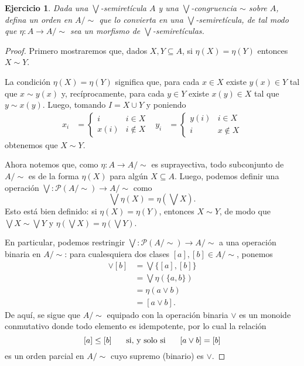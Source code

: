 \documentclass[12pt,letterpaper,titlepage]{article}
\newtheorem{exe}{Ejercicio}
\theoremstyle{definition}
\renewcommand\sup{\vee}
\newcommand\Sup{\bigvee}
\renewcommand\cal[1]{\mathcal{#1}}
\newcommand\simr{{\sim}}
\newcommand\ssi{\hspace{5mm}\text{ si, y solo si }\hspace{5mm}}
\newcommand\<{\langle}
\renewcommand\>{\rangle}
\begin{document}
\begin{exe}%
    Dada una $\Sup$-semiretícula $A$ y una $\Sup$-congruencia
    $\simr$ sobre $A$, defina un orden en $A/\simr$
    que lo convierta en una $\Sup$-semiretícula, de tal modo que
    $\eta:A\to A/\simr$ sea un morfismo de $\Sup$-semiretículas.
\end{exe}
\begin{proof}
    Primero mostraremos que, dados $X,Y\subseteq A$,
    si $\eta(X)=\eta(Y)$ entonces $X\sim Y$.
    
    La condición $\eta(X)=\eta(Y)$ significa que,
    para cada $x\in X$ existe $y(x)\in Y$
    tal que $x\sim y(x)$ y, recíprocamente,
    para cada $y\in Y$ existe $x(y)\in X$ tal que $y\sim x(y)$.
    Luego, tomando $I=X\cup Y$ y poniendo
    \begin{align*}
        x_i &=
            \begin{cases}
                i & i\in X \\
                x(i) & i\nin X
            \end{cases}
        &
        y_i &=
            \begin{cases}
                y(i) & i\in X \\
                i & x\nin X
            \end{cases}
    \end{align*}
    obtenemos que $X\sim Y$.
    
    Ahora notemos que, como $\eta:A\to A/\simr$ es suprayectiva,
    todo subconjunto de $A/\simr$ es de la forma
    $\eta(X)$ para algún $X\subseteq A$.
    Luego, podemos definir una operación
    $\Sup:\cal P(A/\simr)\to A/\simr$ como
    \[
        \Sup \eta(X) = \eta(\Sup X)
    .\]
    Esto está bien definido: si $\eta(X)=\eta(Y)$,
    entonces $X\sim Y$, de modo que $\Sup X\sim\Sup Y$ y
    $\eta(\Sup X)=\eta(\Sup Y)$.
    
    En particular, podemos restringir $\Sup:\cal P(A/\simr)\to A/\simr$
    a una operación binaria en $A/\simr$:
    para cualesquiera dos clases $[a],[b]\in A/\simr$, ponemos
    \begin{align*}
        [a]\sup[b]
        &= \Sup\{[a],[b]\} \\
        &= \Sup\eta(\{a,b\}) \\
        &= \eta(a\sup b) \\
        &= [a\sup b].
    \end{align*}
    De aquí, se sigue que $A/\simr$ equipado con
    la operación binaria $\sup$ es un monoide conmutativo donde
    todo elemento es idempotente,
    por lo cual la relación
    \[
        [a]\leq[b] \ssi [a\sup b]=[b]
    \]
    es un orden parcial en $A/\simr$ cuyo supremo (binario) es $\sup$.
    

\end{proof}
\end{document}
